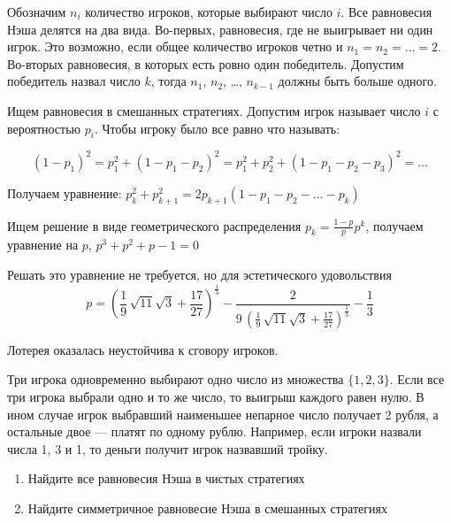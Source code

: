 \begin{solution}
Обозначим $n_i$ количество игроков, которые выбирают число $i$. Все равновесия Нэша делятся на два вида. Во-первых, равновесия, где не выигрывает ни один игрок. Это возможно, если общее количество игроков четно и $n_1=n_2=\ldots=2$. Во-вторых равновесия, в которых есть ровно один победитель. Допустим победитель назвал число $k$, тогда $n_1$, $n_2$, \ldots, $n_{k-1}$ должны быть больше одного.

Ищем равновесия в смешанных стратегиях. Допустим игрок называет число $i$  с вероятностью $p_i$. Чтобы игроку было все равно что называть:


\[
(1-p_1)^2 = p_1^2+(1-p_1-p_2)^2 = p_1^2+p_2^2+(1-p_1-p_2-p_3)^2 =\ldots
\]

Получаем уравнение:
$p_{k}^{2}+p_{k+1}^{2}=2p_{k+1}(1-p_{1}-p_{2}-...-p_{k})$

Ищем решение в виде геометрического распределения $p_{k}=\frac{1-p}{p}p^{k}$, получаем уравнение на $p$, 
$p^{3}+p^{2}+p-1=0$ 

Решать это уравнение не требуется, но для эстетического удовольствия
\[
p = {\left(\frac{1}{9} \, \sqrt{11} \sqrt{3} + \frac{17}{27}\right)}^{\frac{1}{3}} - \frac{2}{9 \, {\left(\frac{1}{9} \, \sqrt{11} \sqrt{3} + \frac{17}{27}\right)}^{\frac{1}{3}}} - \frac{1}{3}
\]

Лотерея оказалась неустойчива к сговору игроков.  
\end{solution}


\begin{problem}
Три игрока одновременно выбирают одно число из множества $\{1,2,3\}$. Если все три игрока выбрали одно и то же число, то выигрыш каждого равен нулю. В ином случае игрок выбравший наименьшее непарное число получает 2 рубля, а остальные двое --- платят по одному рублю. Например, если игроки назвали числа 1, 3 и 1, то деньги получит игрок назвавший тройку. 
\begin{enumerate}
\item  Найдите все равновесия Нэша в чистых стратегиях 
\item  Найдите симметричное равновесие Нэша в смешанных стратегиях 
\end{enumerate}
\end{problem}

